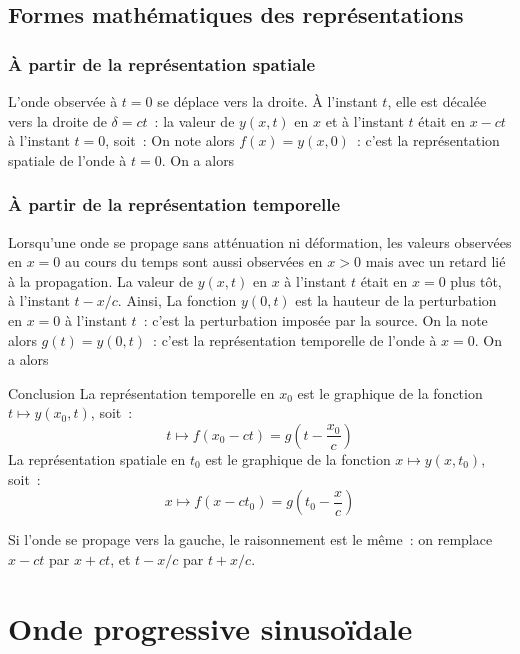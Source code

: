 \documentclass[../main/main.tex]{subfiles}
\begin{document}
\subsection{Formes mathématiques des représentations}
\subsubsection{À partir de la représentation spatiale}
L'onde observée à $t=0$ se déplace vers la droite. À l'instant $t$, elle est
décalée vers la droite de $\delta = ct$~: la valeur de $y(x,t)$ en $x$ et à
l'instant $t$ était en $x-ct$ à l'instant $t=0$, soit~:
On note alors $f(x) = y(x,0)$~: c'est la représentation spatiale de l'onde à
$t=0$. On a alors
\vspace{-20pt}
\subsubsection{À partir de la représentation temporelle}

Lorsqu’une onde se propage sans atténuation ni déformation, les valeurs
observées en $x = 0$ au cours du temps sont aussi observées en $x > 0$ mais avec
un retard \!\!\!\! lié à la propagation.
La valeur de $y(x, t)$ en $x$ à l’instant $t$ était en $x = 0$ plus tôt, à
l’instant $t - x/c$. Ainsi,
La fonction $y(0,t)$ est la hauteur de la perturbation en $x=0$ à l'instant
$t$~: c'est la perturbation imposée par la source. On la note alors $g(t) =
y(0,t)$~: c'est la représentation temporelle de l'onde à $x=0$. On a alors

\begin{brorside}{Conclusion}
    La représentation temporelle en $x_0$ est le graphique de la fonction $t
    \mapsto y(x_0,t)$, soit~:
    \[t\mapsto f(x_0-ct) = g\left(t - \frac{x_0}{c}\right)\]
    \tcblower
    La représentation spatiale en $t_0$ est le graphique de la fonction $x
    \mapsto y(x,t_0)$, soit~:
    \[x\mapsto f(x-ct_0) = g\left(t_0 - \frac{x}{c}\right)\]
\end{brorside}

Si l'onde se propage vers la gauche, le raisonnement est le même~: on remplace
$x-ct$ par $x+ct$, et $t-x/c$ par $t+x/c$.

\section{Onde progressive sinuso\"idale}
\end{document}
